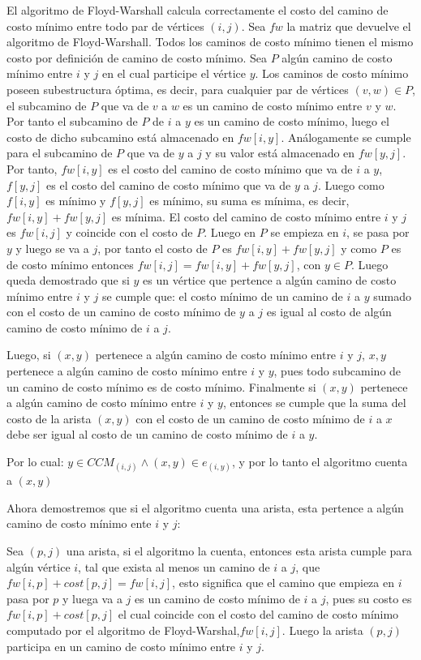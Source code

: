 \documentclass[article]{llncs}
\begin{document}
El algoritmo de Floyd-Warshall calcula correctamente el costo del camino de costo m\'inimo entre todo par de v\'ertices $(i,j)$. 
Sea $fw$ la matriz que devuelve el algoritmo de Floyd-Warshall. Todos los caminos de costo m\'inimo tienen el mismo costo por definici\'on 
de camino de costo m\'inimo. Sea $P$ alg\'un camino de costo m\'inimo entre $i$ y $j$ en el cual participe el v\'ertice $y$. Los caminos de costo 
m\'inimo poseen subestructura \'optima, es decir, para cualquier par de v\'ertices $(v,w) \in P$, el subcamino de $P$ que va de $v$ a $w$ es un camino de costo 
m\'inimo entre $v$ y $w$. Por tanto el subcamino de $P$ de $i$ a $y$ es un camino de costo m\'inimo, luego el costo de dicho subcamino est\'a almacenado en $fw[i,y]$. 
An\'alogamente se cumple para el subcamino de $P$ que va de $y$ a $j$ y su valor est\'a almacenado en $fw[y,j]$. Por tanto, $fw[i,y]$ es el costo 
del camino de costo m\'inimo que va de $i$ a $y$, $f[y,j]$ es el costo del camino de costo m\'inimo que va de $y$ a $j$. Luego como $f[i,y]$ es m\'inimo y 
$f[y,j]$ es m\'inimo, su suma es m\'inima, es decir, $fw[i,y] + fw[y,j]$ es m\'inima. El costo del camino de costo m\'inimo entre $i$ y $j$ es $fw[i,j]$  y coincide con el costo de $P$. 
Luego en $P$ se empieza en $i$, se pasa por $y$ y luego se va a $j$, por tanto el costo de $P$ es $fw[i,y] + fw[y,j]$ y como $P$ es de costo m\'inimo entonces 
$fw[i,j] = fw[i,y] + fw[y,j]$, con $y \in P$. Luego queda demostrado que si $y$ es un vértice que pertence a algún camino de costo mínimo entre $i$ y $j$ se cumple que: 
el costo mínimo de un camino de $i$ a $y$ sumado con el costo de un camino de costo mínimo de $y$ a $j$ es igual al costo de algún camino de costo mínimo de $i$ a $j$. 

Luego, si $(x,y)$ pertenece a algún camino de costo mínimo entre $i$ y $j$, $x,y$ pertenece a algún camino de costo mínimo entre $i$ y $y$, pues todo subcamino de un camino de costo mínimo es de costo mínimo.
Finalmente si $(x,y)$ pertenece a algún camino de costo mínimo entre $i$ y $y$, entonces se cumple que la suma del costo de la arista $(x,y)$ con el costo de un camino de costo mínimo de $i$ a $x$ debe ser igual
al costo de un camino de costo mínimo de $i$ a $y$. 

Por lo cual: $ y \in CCM_(i,j) \land (x,y) \in e_(i,y)$, y por lo tanto el algoritmo cuenta a $(x,y)$

Ahora demostremos que si el algoritmo cuenta una arista, esta pertence a algún camino de costo mínimo ente $i$ y $j$:

Sea $(p,j)$ una arista, si el algoritmo la cuenta, entonces esta arista cumple para alg\'un vértice $i$, tal que exista al menos un camino de $i$ a $j$, que 
$fw[i,p] + cost[p,j] = fw[i,j]$, esto significa que el camino que empieza en $i$ pasa por $p$ y luega va a $j$ es un camino de costo m\'inimo de $i$ a $j$, 
pues su costo es $fw[i,p] + cost[p,j]$ el cual coincide con el costo del camino de costo m\'inimo computado por el algoritmo de Floyd-Warshal,$fw[i,j]$. Luego 
la arista $(p,j)$ participa en un camino de costo m\'inimo entre $i$ y $j$.
\end{document}

